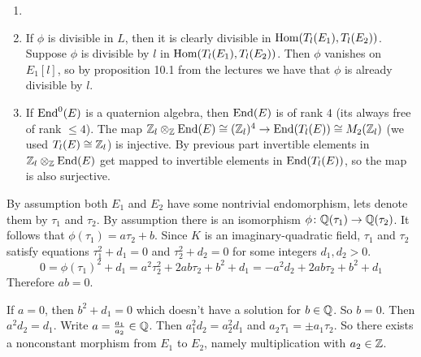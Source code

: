 \newcommand{\sheet}{10}




\maketitle{}

\begin{exercise}{1}
    \begin{enumerate}
        \item{
            }
        \item{
                If $\phi$ is divisible in $L$, then it is clearly divisible in
                $\operatorname{Hom}(T_l(E_1), T_l(E_2))$.
                Suppose $\phi$ is divisible by $l$ in $\operatorname{Hom}(T_l(E_1),
                T_l(E_2))$. Then $\phi$ vanishes on $E_1[l]$, so by
                proposition 10.1 from the lectures we have that $\phi$ is
                already divisible by $l$.
            }
        \item{
                If $\operatorname{End}^0(E)$ is a quaternion algebra, then $\operatorname{End}(E)$ is of
                rank $4$ (its always free of rank $\leq 4$).
                The map $\mathbb{Z}_l \otimes_{\mathbb{Z}} \operatorname{End}(E) \cong (\mathbb{Z}_l)^4 \to \operatorname{End}(T_l(E))
                \cong M_2(\mathbb{Z}_l)$ (we used $T_l(E) \cong \mathbb{Z}_l$) is injective.
                By previous part invertible elements in $\mathbb{Z}_l \otimes_{\mathbb{Z}}
                \operatorname{End}(E)$ get mapped to invertible elements in $\operatorname{End}(T_l(E))$, so
                the map is also surjective.
            }
    \end{enumerate}
\end{exercise}

\begin{exercise}{2}
    By assumption both $E_1$ and $E_2$ have some nontrivial endomorphism, lets
    denote them by $\tau_1$ and $\tau_2$. By assumption there is an isomorphism
    $\phi \colon \mathbb{Q}(\tau_1) \to \mathbb{Q}(\tau_2)$. It follows that $\phi(\tau_1) = a
    \tau_2 + b$. Since $K$ is an imaginary-quadratic field, $\tau_1$ and
    $\tau_2$ satisfy equations $\tau^2_1 + d_1 = 0$ and $\tau^2_2 + d_2 = 0$ for
    some integers $d_1, d_2 > 0$. 
    \begin{equation*}
    0 = \phi(\tau_1)^2 + d_1 = a^2 \tau^2_2 + 2 a b \tau_2 + b^2 + d_1 =
    - a^2 d_2 + 2 a b \tau_2 + b^2 + d_1
    \end{equation*}
    Therefore $a b = 0$.

    If $a = 0$, then $b^2 + d_1 = 0$ which doesn't have a solution for $b \in
    \mathbb{Q}$. So $b = 0$.
    Then $a^2 d_2 = d_1$. Write $a = \frac{a_1}{a_2} \in \mathbb{Q}$. Then
    $a^2_1 d_2 = a^2_2 d_1$ and $a_2 \tau_1 = \pm a_1 \tau_2$. So there exists a
    nonconstant morphism from $E_1$ to $E_2$, namely multiplication with $a_2
    \in \mathbb{Z}$.

\end{exercise}


